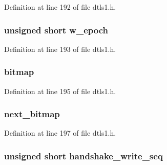 Definition at line 192 of file dtls1.\+h.

\subsubsection[{\texorpdfstring{w\+\_\+epoch}{w_epoch}}]{\setlength{\rightskip}{0pt plus 5cm}unsigned short w\+\_\+epoch}\hypertarget{structdtls1__state__st_a07f814f5c84eeeb5692055b2ca77bc02}{}\label{structdtls1__state__st_a07f814f5c84eeeb5692055b2ca77bc02}


Definition at line 193 of file dtls1.\+h.

\subsubsection[{\texorpdfstring{bitmap}{bitmap}}]{ bitmap}\hypertarget{structdtls1__state__st_a20cdb990d84c97f9a43bd72f9b04e892}{}\label{structdtls1__state__st_a20cdb990d84c97f9a43bd72f9b04e892}


Definition at line 195 of file dtls1.\+h.

\subsubsection[{\texorpdfstring{next\+\_\+bitmap}{next_bitmap}}]{ next\+\_\+bitmap}\hypertarget{structdtls1__state__st_a2c9ef3fa9fe22648a8d478ef3209748f}{}\label{structdtls1__state__st_a2c9ef3fa9fe22648a8d478ef3209748f}


Definition at line 197 of file dtls1.\+h.

\subsubsection[{\texorpdfstring{handshake\+\_\+write\+\_\+seq}{handshake_write_seq}}]{\setlength{\rightskip}{0pt plus 5cm}unsigned short handshake\+\_\+write\+\_\+seq}\hypertarget{structdtls1__state__st_af54dde18bf5320413ac47b7afeec89fc}{}\label{structdtls1__state__st_af54dde18bf5320413ac47b7afeec89fc}


